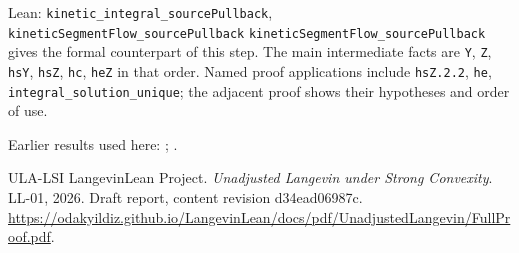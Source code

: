 \documentclass[11pt,a4paper]{article}
\begin{document}
\begin{leanbox}{Lean: \texttt{kinetic\_\allowbreak{}integral\_\allowbreak{}sourcePullback}, \texttt{kineticSegmentFlow\_\allowbreak{}sourcePullback}}
\texttt{kinetic\allowbreak{}Segment\allowbreak{}Flow\_\allowbreak{}source\allowbreak{}Pullback} gives the formal counterpart of this step. The main intermediate facts are \texttt{Y}, \texttt{Z}, \texttt{hs\allowbreak{}Y}, \texttt{hs\allowbreak{}Z}, \texttt{hc}, \texttt{he\allowbreak{}Z} in that order. Named proof applications include \texttt{hs\allowbreak{}Z.\allowbreak{}2.\allowbreak{}2}, \texttt{he}, \texttt{integral\_\allowbreak{}solution\_\allowbreak{}unique}; the adjacent proof shows their hypotheses and order of use.
\end{leanbox}


Earlier results used here: \cite[Section~3.13.2]{LangevinLean2026ULASC}; \cite[Section~3.13.5]{LangevinLean2026ULASC}.

\begin{thebibliography}{ULA-LSI}
LangevinLean Project. \emph{Unadjusted Langevin under Strong Convexity}. LL-01, 2026. Draft report, content revision d34ead06987c. \url{https://odakyildiz.github.io/LangevinLean/docs/pdf/UnadjustedLangevin/FullProof.pdf}.
\end{thebibliography}
\end{document}
